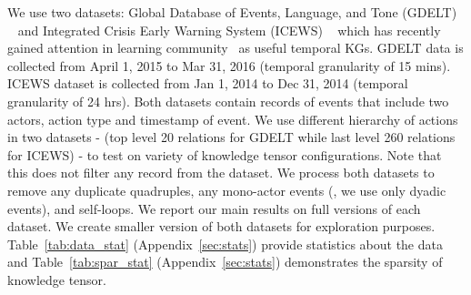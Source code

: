 \documentclass{article}
\begin{document}
We use two datasets: Global Database of Events, Language, and Tone (GDELT) ~\cite{LeeSch13} and Integrated Crisis Early Warning System (ICEWS) ~\cite{BosLauObrSheStaWar17} which has recently gained attention in learning community~\cite{SchZhoMinBleWal16} as useful temporal KGs. GDELT data is collected from April 1, 2015 to Mar 31, 2016 (temporal granularity of 15 mins). ICEWS dataset is collected from Jan 1, 2014 to Dec 31, 2014 (temporal granularity of 24 hrs). Both datasets contain records of events that include two actors, action type and timestamp of event. We use different hierarchy of actions in two datasets - (top level 20 relations for GDELT while last level 260 relations for ICEWS) - to test on variety of knowledge tensor configurations. Note that this does not filter any record from the dataset. We process both datasets to remove any duplicate quadruples, any mono-actor events (\ie, we use only dyadic events), and  self-loops. We report our main results on full versions of each dataset. We create 
smaller version of both datasets for exploration purposes. Table~\ref{tab:data_stat} (Appendix~\ref{sec:stats}) provide statistics about the data and Table~\ref{tab:spar_stat} (Appendix~\ref{sec:stats}) demonstrates the sparsity of knowledge tensor.
%
%
%
\end{document}
